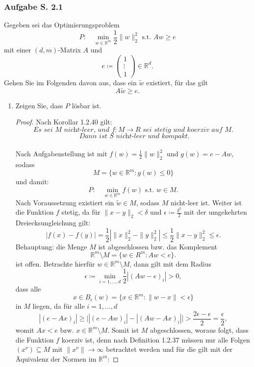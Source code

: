 \documentclass[12pt]{extreport} %
\newcommand{\R}{\mathbb{R}}
\theoremstyle{named}
\theoremstyle{nnamed}
\theoremstyle{itshape}
\theoremstyle{normal}
\begin{document}
\subsubsection{Aufgabe S. 2.1} 

Gegeben sei das Optimierungsproblem
$$ P: \quad \min_{w \in \R^m} \frac{1}{2} \| w \|_2^2 \text{ s.t. } Aw \geq e $$
mit einer $(d, m)$-Matrix $A$ und
$$ e \coloneqq \left(\begin{array}{c} 1 \\ \vdots \\ 1 \end{array}\right) \in \R^d. $$
Gehen Sie im Folgenden davon aus, dass ein $\tilde{w}$ existiert, für das gilt
$$ A \tilde{w} \geq e. $$
\begin{enumerate}
	\item Zeigen Sie, dass $P$ lösbar ist.
		\begin{proof}
			Nach Korollar 1.2.40 gilt:
				$$ \textit{Es sei } M \textit{ nicht-leer, und } f \colon M \rightarrow R \textit{ sei stetig und koerziv auf } M. $$
				$$ \textit{ Dann ist } S \textit{ nicht-leer und kompakt.} $$ ~\\
			Nach Aufgabenstellung ist mit $f(w) = \frac{1}{2} \| w \|_2^2$ und $g(w) = e - Aw$, sodass 
				$$ M = \{ w \in \R^m \colon  g(w) \leq 0 \} $$ 
			und damit:
				$$ P: \quad \min_{w \in \R^m} f(w) \text{ s.t. } w \in M. $$
			Nach Voraussetzung existiert ein $\tilde{w} \in M$, sodass $M$ nicht-leer ist. Weiter ist die Funktion $f$ stetig, da für $\| x - y \|_2 < \delta$ und $\epsilon \coloneqq \frac{\delta^2}{2}$ mit der umgekehrten Dreiecksungleichung gilt:	
			$$ \left| f(x) - f(y) \right| = \frac{1}{2} \left| \| x \|^2_2 - \| y \|_2^2 \right| \leq \frac{1}{2} \| x - y \|_2^2 \leq \epsilon. $$
			Behauptung: die Menge $M$ ist abgeschlossen bzw. das Komplement
			$$ \R^m \setminus M = \{ w \in R^m \colon A w < e \}. $$
			ist offen. Betrachte hierfür $w \in \R^m \setminus M$, dann gilt mit dem Radius
			$$ \epsilon \coloneqq \min_{i = 1, \dotsc, d} \frac{1}{2} \left| (Aw - e)_i \right| > 0, $$ 
			dass alle 
			$$ x \in B_{\epsilon}(w) = \{ x \in \R^m \colon \| w - x \| < \epsilon \} $$
			in $M$ liegen, da für alle $i = 1, \dotsc, d$
			$$ \left| (e - Ax)_i \right| \geq \big| \left| (e - Aw)_i \right| - \left| (Aw - Ax)_i \right| \big| > \frac{2 \epsilon - \epsilon}{2} = \frac{\epsilon}{2}, $$
			womit $Ax < e$ bzw. $x \in \R^m \setminus M$. Somit ist $M$ abgeschlossen, woraus folgt, dass die Funktion $f$ koerziv ist, denn nach Definition 1.2.37 müssen nur alle Folgen $(x^\nu) \subseteq M$ mit $\| x^\nu \| \rightarrow \infty$ betrachtet werden und für die gilt mit der Äquivalenz der Normen im $\R^m$:

\end{proof}
\end{enumerate}
\end{document}
